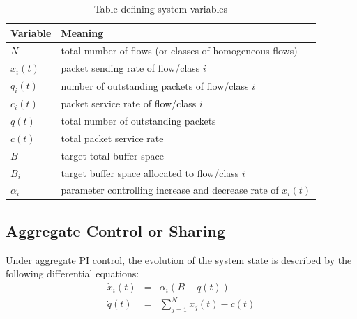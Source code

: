 \documentclass{article}
\begin{document}
{\small
\begin{table}[htbp]
\begin{center}
\caption{Table defining system variables}
\label{tab:model}
\begin{tabular}{|l|l|} \hline
Variable & Meaning \\\hline \hline
$N$ & total number of flows (or classes of
homogeneous flows) \\
$x_i(t)$  & packet sending rate of flow/class $i$  \\
$q_i(t)$  & number of outstanding packets of flow/class $i$  \\
$c_i(t)$  & packet service rate of flow/class $i$  \\
$q(t)$    & total number of outstanding packets  \\
$c(t)$    & total packet service rate \\ 
$B$      & target total buffer space \\
$B_i$    & target buffer space allocated to flow/class $i$ \\
$\alpha_i$ & parameter controlling increase and 
	decrease rate of $x_i(t)$ \\ \hline 
\end{tabular}
\end{center}
\end{table}
}



\subsection{Aggregate Control or Sharing}
\label{sec:aggregate-control}

Under aggregate PI control,
the evolution of the system state is described by the following
differential equations:
\begin{eqnarray}
\dot{x}_i(t) &=& \alpha_i (B-q(t)) \nonumber \\ 
\dot{q}(t) &=& \sum_{j=1}^{N} x_j(t) - c(t) 
\label{eqn:aggregate-state}
\end{eqnarray}
\end{document}
